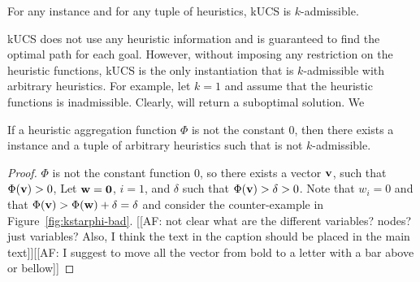 \begin{theorem}
  \label{thm:arbitrary}
  For any \kgs instance and for any tuple of heuristics, \ac{kUCS} is $k$-admissible.
\end{theorem}

\ac{kUCS} does not use any heuristic information and is guaranteed to find the optimal path for each goal. However, without imposing any restriction on the heuristic functions, \ac{kUCS} is the only \kastar instantiation that is $k$-admissible with arbitrary heuristics. 
For example, let $k=1$ and assume that the heuristic functions is inadmissible. Clearly, \kastar will return a suboptimal solution. We 

\begin{theorem}
  \label{thm:arbitrary-dual}
  If a heuristic aggregation function $\Phi$ is not the constant 0, then there exists a \kgs instance and a tuple of arbitrary heuristics such that \kastarphi is not $k$-admissible.
\end{theorem}
\begin{proof}
  $\Phi$ is not the constant function 0, so there exists a vector $\mathbf{v}$, such that $\Phi(\mathbf{v}) > 0$,
  Let $\mathbf{w} = \mathbf{0}$, $i = 1$, and $\delta$ such that $\Phi(\mathbf{v}) > \delta > 0$.
  Note that $w_i = 0$ and that $\Phi(\mathbf{v}) > \Phi(\mathbf{w}) + \delta = \delta$ and consider the counter-example in Figure~\ref{fig:kstarphi-bad}. [[AF: not clear what are the different variables? nodes? just variables? Also, I think the text in the caption should be placed in the main text]][[AF: I suggest to move all the vector from bold to a letter with a bar above or bellow]]
\end{proof}




